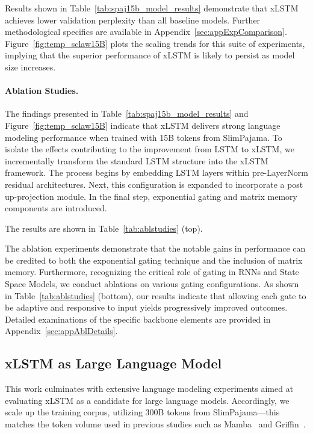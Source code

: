 Results shown in Table~\ref{tab:spaj15b_model_results} demonstrate that xLSTM achieves lower validation perplexity than all baseline models. Further methodological specifics are available in Appendix~\ref{sec:appExpComparison}. Figure~\ref{fig:temp_sclaw15B} plots the scaling trends for this suite of experiments, implying that the superior performance of xLSTM is likely to persist as model size increases.

\paragraph{Ablation Studies.}
The findings presented in Table~\ref{tab:spaj15b_model_results} and Figure~\ref{fig:temp_sclaw15B} indicate that xLSTM delivers strong language modeling performance when trained with 15B tokens from SlimPajama. To isolate the effects contributing to the improvement from LSTM to xLSTM, we incrementally transform the standard LSTM structure into the xLSTM framework. The process begins by embedding LSTM layers within pre-LayerNorm residual architectures. Next, this configuration is expanded to incorporate a post up-projection module. In the final step, exponential gating and matrix memory components are introduced.

The results are shown in Table~\ref{tab:ablstudies} (top). 

The ablation experiments demonstrate that the notable gains in performance can be credited to both the exponential gating technique and the inclusion of matrix memory. Furthermore, recognizing the critical role of gating in RNNs and State Space Models, we conduct ablations on various gating configurations. As shown in Table~\ref{tab:ablstudies} (bottom), our results indicate that allowing each gate to be adaptive and responsive to input yields progressively improved outcomes. Detailed examinations of the specific backbone elements are provided in Appendix~\ref{sec:appAblDetails}.

\subsection{xLSTM as Large Language Model}
\label{sec:ExpLanguage}

This work culminates with extensive language modeling experiments aimed at evaluating xLSTM as a candidate for large language models. Accordingly, we scale up the training corpus, utilizing 300B tokens from SlimPajama—this matches the token volume used in previous studies such as Mamba~\citep{Gu:24arxiv} and Griffin~\citep{De:24arxiv}.

